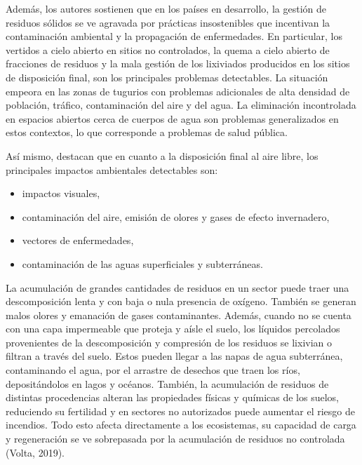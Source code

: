 Además, los autores sostienen que en los países en desarrollo, la gestión de residuos sólidos se ve agravada por prácticas insostenibles que incentivan la contaminación ambiental y la propagación de enfermedades. En particular, los vertidos a cielo abierto en sitios no controlados, la quema a cielo abierto de fracciones de residuos y la mala gestión de los lixiviados producidos en los sitios de disposición final, son los principales problemas detectables. La situación empeora en las zonas de tugurios con problemas adicionales de alta densidad de población, tráfico, contaminación del aire y del agua. La eliminación incontrolada en espacios abiertos cerca de cuerpos de agua son problemas generalizados en estos contextos, lo que corresponde a problemas de salud pública. 

Así mismo, destacan que en cuanto a la disposición final al aire libre, los principales impactos ambientales detectables son:

\begin{itemize}
    \item impactos visuales,
    
    \item contaminación del aire, emisión de olores y gases de efecto invernadero,
    
    \item vectores de enfermedades,
    
    \item contaminación de las aguas superficiales y subterráneas.
\end{itemize}

La acumulación de grandes cantidades de residuos en un sector  puede traer una descomposición lenta y con baja o nula presencia de oxígeno. También se generan malos olores y emanación de gases contaminantes. Además, cuando no se cuenta con una capa impermeable que proteja y aísle el suelo, los líquidos percolados provenientes de la descomposición y compresión de los residuos se lixivian o filtran a través del suelo. Estos  pueden llegar a las napas de agua subterránea, contaminando el agua, por el arrastre de desechos que traen los ríos, depositándolos en lagos y océanos. También, la acumulación de residuos de distintas procedencias alteran las propiedades físicas y químicas de los suelos, reduciendo su fertilidad y en sectores no autorizados puede aumentar el riesgo de incendios. Todo esto afecta directamente a los ecosistemas, su capacidad de carga y regeneración se ve sobrepasada por la acumulación de residuos no controlada (Volta, 2019).

